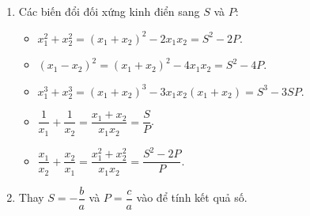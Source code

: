 \begin{enumerate}
\item Các biến đổi đối xứng kinh điển sang $S$ và $P$:
\begin{itemize}
\item $x_1^2 + x_2^2 = (x_1 + x_2)^2 - 2x_1 x_2 = \boxed{S^2 - 2P}$.
\item $(x_1 - x_2)^2 = (x_1 + x_2)^2 - 4x_1 x_2 = \boxed{S^2 - 4P}$.
\item $x_1^3 + x_2^3 = (x_1 + x_2)^3 - 3x_1 x_2(x_1 + x_2) = \boxed{S^3 - 3SP}$.
\item $\dfrac{1}{x_1} + \dfrac{1}{x_2} = \dfrac{x_1 + x_2}{x_1 x_2} = \boxed{\dfrac{S}{P}}$.
\item $\dfrac{x_1}{x_2} + \dfrac{x_2}{x_1} = \dfrac{x_1^2 + x_2^2}{x_1 x_2} = \boxed{\dfrac{S^2 - 2P}{P}}$.
\end{itemize}
\item Thay $S = -\dfrac{b}{a}$ và $P = \dfrac{c}{a}$ vào để tính kết quả số.
\end{enumerate}
